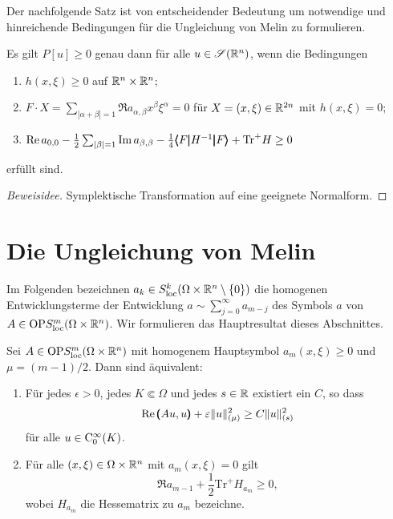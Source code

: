 Der nachfolgende Satz ist von entscheidender Bedeutung um notwendige und hinreichende Bedingungen für die Ungleichung von Melin zu formulieren.

\begin{thm}\label{satz:thm2.4}
Es gilt $P[u]\ge0$ genau dann für alle $u\in\mathscr S(\mathbb R^n)$, wenn die Bedingungen
\begin{enumerate}
\item  $h(x,\xi)\ge0$ auf $\mathbb R^n\times\mathbb R^n$;
\item $F \cdot X = \sum_{|\alpha+\beta|=1} \Re a_{\alpha,\beta} x^\beta\xi^\alpha = 0$ für $X=(x,\xi)\in\mathbb R^{2n}$ mit $h(x,\xi)=0$;
\item $\operatorname{Re} a_{0,0} - \frac12 \sum_{|\beta|=1} \operatorname{Im} a_{\beta,\beta} -\frac14  \pmb\langle F\pmb|H^{-1}\pmb|F\pmb\rangle + {\mathrm{Tr}}^+ H \ge 0$
\end{enumerate}
erfüllt sind.
\end{thm}
\begin{proof}[Beweisidee]
Symplektische Transformation auf eine geeignete Normalform. 
\end{proof}


\section{Die Ungleichung von Melin}
Im Folgenden bezeichnen $a_k\in S^{k}_\mathrm{loc}(\Omega\times\mathbb R^n\setminus\{0\})$ die homogenen Entwicklungsterme der Entwicklung $a\sim\sum_{j=0}^\infty a_{m-j}$ des Symbols $a$ von $A\in\mathrm{OP}S^{m}_{\rm loc}(\Omega\times\mathbb R^n)$. Wir formulieren das Hauptresultat dieses Abschnittes. 

\begin{thm}
Sei $A\in\mathrm{OP}S^{m}_{\rm loc}(\Omega\times\mathbb R^n)$ mit homogenem Hauptsymbol $a_m(x,\xi)\ge0$ und $\mu=(m-1)/2$. Dann sind \"aquivalent:
\begin{enumerate}
\item F\"ur jedes $\epsilon>0$, jedes $K\Subset\Omega$ und jedes $s\in\mathbb R$ existiert ein $C$, so dass
\begin{equation}
    \operatorname{Re} \pmb(Au,u\pmb) + \varepsilon \|u\|^2_{(\mu)}  \ge C\|u\|_{(s)}^2\label{ungleichungvonmelin}
\end{equation}
für alle $u\in\mathrm C_0^\infty(K)$.
\item
Für alle $(x,\xi)\in\Omega\times\mathbb R^n$ mit $a_m(x,\xi)=0$ gilt
\begin{equation}\label{bedfuerungleichung}
   \Re a_{m-1} +  \frac 1 2 {\mathrm{Tr}}^+ H_{a_m} \ge 0,
\end{equation}
wobei $H_{a_m}$ die Hessematrix zu $a_m$ bezeichne.
\end{enumerate}
\end{thm}

